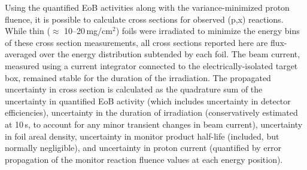 Using the quantified EoB activities along with the variance-minimized proton fluence, it is possible to calculate 
cross sections for 
observed (p,x) reactions.
While thin ($\approx$ 10--20\,mg/cm$^2$)  foils were irradiated to minimize the energy bins of these cross section measurements, 
all cross sections reported here are flux-averaged  
over the energy distribution subtended by each foil.
The beam current, measured using a current integrator connected to the electrically-isolated target box, remained stable for the duration of the irradiation.
The propagated uncertainty in cross section is calculated as the quadrature sum of the uncertainty in quantified EoB activity (which includes uncertainty in detector efficiencies), uncertainty in the duration of irradiation (conservatively estimated at 10\,s, to account for any minor transient changes in beam current), uncertainty in foil areal density, uncertainty in monitor product half-life (included, but normally negligible),  and uncertainty in proton current (quantified by error propagation of the monitor reaction fluence values  at each energy position).




